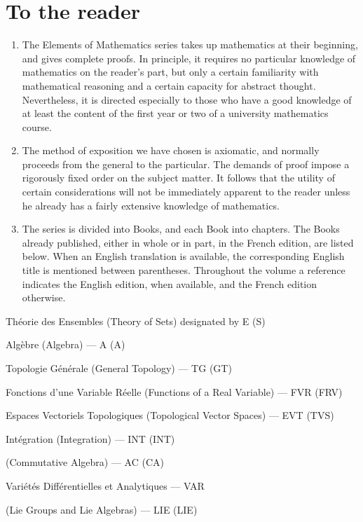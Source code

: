 \chapter*{To the reader}
{}

\begin{enumerate}
\def\labelenumi{\arabic{enumi}.}
\item
  The Elements of Mathematics series takes up mathematics at their beginning, and gives complete proofs. In principle, it requires no particular knowledge of mathematics on the reader's part, but only a certain familiarity with mathematical reasoning and a certain capacity for abstract thought. Nevertheless, it is directed especially to those who have a good knowledge of at least the content of the first year or two of a university mathematics course.
\item
  The method of exposition we have chosen is axiomatic, and normally proceeds from the general to the particular. The demands of proof impose a rigorously fixed order on the subject matter. It follows that the utility of certain considerations will not be immediately apparent to the reader unless he already has a fairly extensive knowledge of mathematics.
\item
  The series is divided into Books, and each Book into chapters. The Books already published, either in whole or in part, in the French edition, are listed below. When an English translation is available, the corresponding English title is mentioned between parentheses. Throughout the volume a reference indicates the English edition, when available, and the French edition otherwise.
\end{enumerate}

Théorie des Ensembles (Theory of Sets) designated by E (S)

Algèbre (Algebra) --- A (A)

Topologie Générale (General Topology) --- TG (GT)

Fonctions d'une Variable Réelle (Functions of a Real Variable) --- FVR (FRV)

Espaces Vectoriels Topologiques (Topological Vector Spaces) --- EVT (TVS)

Intégration (Integration) --- INT (INT)

(Commutative Algebra) --- AC (CA)

Variétés Différentielles et Analytiques --- VAR

(Lie Groups and Lie Algebras) --- LIE (LIE)

